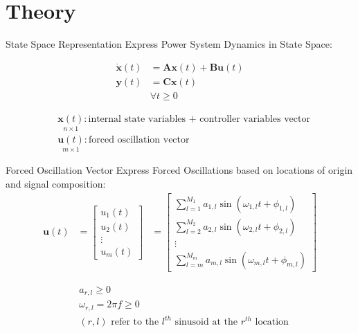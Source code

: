 \section[Theory]{Theory}
\label{sec:lasso_theory}

\begin{frame}[fragile]{State Space Representation}
	Express Power System Dynamics in State Space:

	\begin{align*}
		\dot{\textbf{x}}(t) &= 
		\textbf{A}\textbf{x}(t)
		+ \textbf{B}\textbf{u}(t)\\
		\textbf{y}(t) &= 
		\textbf{C}\textbf{x}(t)\\  
		& \forall t\geq0	
	\end{align*}
	
	\begin{align*}
		& \underset{\scriptscriptstyle n\times 1}{\textbf{x}(t)} : \text{internal state variables + controller variables vector}                                                                      \\
		& \underset{\scriptscriptstyle m\times 1}{\textbf{u}(t)} : \text{forced oscillation vector}
	\end{align*}
\end{frame}

\begin{frame}[fragile]{Forced Oscillation Vector}
	Express Forced Oscillations based on locations of origin and signal composition:
	\begin{align*}
		\textbf{u}(t) 
		&= 
		\begin{bmatrix}
			u_1(t) \\
			u_2(t) \\
			\vdots \\
			u_m(t)
		\end{bmatrix} 
		&=	
		\begin{bmatrix}
			\sum_{l=1}^{M_1} a_{1,l} \sin(\omega_{1,l}t + \phi_{1,l}) \\
			\sum_{l=2}^{M_2} a_{2,l} \sin(\omega_{2,l}t + \phi_{2,l}) \\
			\vdots \\
			\sum_{l=m}^{M_m} a_{m,l} \sin(\omega_{m,l}t + \phi_{m,l})
		\end{bmatrix} 
	\end{align*}
	
	\begin{align*}
		& a_{r,l} \geq0 \\
		& \omega_{r,l} = 2\pi f \geq 0 \\
		& (r,l) \text{ refer to the } l^{th} \text{ sinusoid at the }  r^{th} \text{ location}
	\end{align*}

\end{frame}